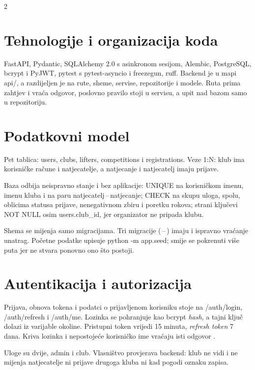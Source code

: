 \documentclass[10pt,a4paper]{article}
\newcommand{\code}[1]{{\ttfamily #1}}
\begin{document}
\begin{multicols}{2}\raggedright

\section{Tehnologije i organizacija koda}

FastAPI, Pydantic, SQLAlchemy 2.0 s asinkronom sesijom, Alembic, PostgreSQL, bcrypt i PyJWT, pytest s \code{pytest-asyncio} i \code{freezegun}, \code{ruff}. Backend je u mapi \code{api/}, a razdijeljen je na rute, sheme, servise, repozitorije i modele. Ruta prima zahtjev i vraća odgovor, poslovno pravilo stoji u servisu, a upit nad bazom samo u repozitoriju.

\section{Podatkovni model}

Pet tablica: \code{users}, \code{clubs}, \code{lifters}, \code{competitions} i \code{registrations}. Veze 1:N: klub ima korisničke račune i natjecatelje, a natjecanje i natjecatelj imaju prijave.

Baza odbija neispravno stanje i bez aplikacije: \code{UNIQUE} na korisničkom imenu, imenu kluba i na paru natjecatelj\,--\,natjecanje; \code{CHECK} na skupu uloga, spolu, oblicima statusa prijave, nenegativnom zbiru i poretku rokova; strani ključevi \code{NOT NULL} osim \code{users.club\_id}, jer organizator ne pripada klubu.

Shema se mijenja samo migracijama. Tri migracije (\code{001}\,--\,\code{003}) imaju i ispravno vraćanje unatrag. Početne podatke upisuje \code{python -m app.seed}; smije se pokrenuti više puta jer ne stvara ponovno ono što postoji.

\section{Autentikacija i autorizacija}

Prijava, obnova tokena i podatci o prijavljenom korisniku stoje na \code{/auth/login}, \code{/auth/refresh} i \code{/auth/me}. Lozinka se pohranjuje kao bcrypt \emph{hash}, a tajni ključ dolazi iz varijable okoline. Pristupni token vrijedi 15 minuta, \emph{refresh token} 7 dana. Kriva lozinka i nepostojeće korisničko ime vraćaju isti odgovor \code{401}.

Uloge su dvije, \code{admin} i \code{club}. Vlasništvo provjerava backend: klub ne vidi i ne mijenja natjecatelje ni prijave drugoga kluba ni kad pogodi oznaku zapisa.


\end{multicols}
\end{document}
